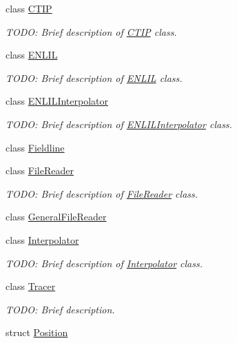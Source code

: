 \begin{DoxyCompactItemize}
\item 
class \hyperlink{classccmc_1_1_c_t_i_p}{C\-T\-I\-P}
\begin{DoxyCompactList}\small\item\em T\-O\-D\-O\-: Brief description of \hyperlink{classccmc_1_1_c_t_i_p}{C\-T\-I\-P} class. \end{DoxyCompactList}\item 
class \hyperlink{classccmc_1_1_e_n_l_i_l}{E\-N\-L\-I\-L}
\begin{DoxyCompactList}\small\item\em T\-O\-D\-O\-: Brief description of \hyperlink{classccmc_1_1_e_n_l_i_l}{E\-N\-L\-I\-L} class. \end{DoxyCompactList}\item 
class \hyperlink{classccmc_1_1_e_n_l_i_l_interpolator}{E\-N\-L\-I\-L\-Interpolator}
\begin{DoxyCompactList}\small\item\em T\-O\-D\-O\-: Brief description of \hyperlink{classccmc_1_1_e_n_l_i_l_interpolator}{E\-N\-L\-I\-L\-Interpolator} class. \end{DoxyCompactList}\item 
class \hyperlink{classccmc_1_1_fieldline}{Fieldline}
\item 
class \hyperlink{classccmc_1_1_file_reader}{File\-Reader}
\begin{DoxyCompactList}\small\item\em T\-O\-D\-O\-: Brief description of \hyperlink{classccmc_1_1_file_reader}{File\-Reader} class. \end{DoxyCompactList}\item 
class \hyperlink{classccmc_1_1_general_file_reader}{General\-File\-Reader}
\item 
class \hyperlink{classccmc_1_1_interpolator}{Interpolator}
\begin{DoxyCompactList}\small\item\em T\-O\-D\-O\-: Brief description of \hyperlink{classccmc_1_1_interpolator}{Interpolator} class. \end{DoxyCompactList}\item 
class \hyperlink{classccmc_1_1_tracer}{Tracer}
\begin{DoxyCompactList}\small\item\em T\-O\-D\-O\-: Brief description. \end{DoxyCompactList}\item 
struct \hyperlink{structccmc_1_1_position}{Position}
\item 

\end{DoxyCompactItemize}
